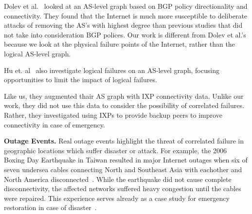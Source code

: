     Dolev et al.~\cite{resilience-under-BGP} looked at an AS-level graph based
    on BGP policy directionality and connectivity. They found that the Internet
    is much more susceptible to deliberate attacks of removing the AS's with
    highest degree than previous studies that did not take into consideration
    BGP polices. Our work is different from Dolev et al.'s because we look at
    the physical failure points of the Internet, rather than the logical
    AS-level graph.
    
    Hu et. al~\cite{ixp-routingdiversity} also investigate logical failures on
    an AS-level graph, focusing opportunities to limit the impact of logical
    failures.

    Like us, they augmented thair AS graph with IXP connectivity data.  Unlike
    our work, they did not use this data to consider the possibility of
    correlated failures.  Rather, they investigated using IXPs to provide
    backup peers to improve connectivity in case of emergency.

{\bf Outage Events.}  Real outage events highlight the threat of correlated
    failure in geographic locations which suffer disaster or attack.  For
    example, the 2006 Boxing Day Earthquake in Taiwan resulted in major
    Internet outages when six of seven undersea cables connecting North and
    Southeast Asia with eachother and North America
    disconnected~\cite{asia-comm-quake}.  While the earthquake did not cause
    complete disconnectivity, the affected networks suffered heavy congestion
    until the cables were repaired.  This experience serves already as a case
    study for emergency restoration in case of disaster~\cite{taiwan}.
        


